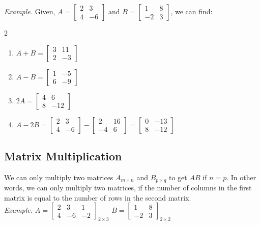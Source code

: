 \documentclass{./../../latex/handout}
\begin{document}
\textit{Example.}
Given, $A = \begin{bmatrix}
2 & 3 \\
4 & -6 
 \end{bmatrix} \text{ and }
B = \begin{bmatrix}
1 & 8 \\
-2 & 3
\end{bmatrix}$, we can find:
\begin{multicols}{2}
\begin{enumerate}\renewcommand{\labelenumi}{\alph{enumi})}
\item \( A+ B = \begin{bmatrix}
3 & 11 \\
2 & -3
\end{bmatrix} \)
\item \( A- B = \begin{bmatrix}
1 & -5 \\
6 & -9
\end{bmatrix} \)
\item \( 2A = \begin{bmatrix}
4 & 6 \\
8 & -12
\end{bmatrix} \)
\item \( A-2B =  \begin{bmatrix}
2 & 3 \\
4 & -6 
 \end{bmatrix} -  \begin{bmatrix}
2 & 16 \\
-4 & 6 
 \end{bmatrix} = \begin{bmatrix}
0 & -13 \\
8 & -12 
 \end{bmatrix} \)
\end{enumerate}
\end{multicols}

\subsection{Matrix Multiplication}

We can only multiply two matrices $A_{m \times n}$ and $B_{p \times q}$ to get $AB$ if $ n = p $. In other words, we can only multiply two matrices, if the number of columns in the first matrix is equal to the number of rows in the second matrix. \\

\textit{Example.}
$A = \begin{bmatrix}
2 & 3 & 1 \\
4 & -6 & -2
\end{bmatrix}_{2 \times 3}$ 
$B = \begin{bmatrix}
1 & 8 \\
-2 & 3
\end{bmatrix}_{2 \times 2}$ 
\end{document}

